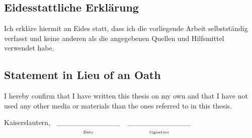 \documentclass[a4paper]{report}
\begin{document}
\tableofcontents
\thispagestyle{empty}
\listoffigures
\thispagestyle{empty}
\begingroup
\thispagestyle{empty}
\let\clearpage\relax
\vspace{3cm}
\listofalgorithms
\let\clearpage\relax
\vspace{3cm}
\listoftables
\endgroup
\thispagestyle{empty}
















\pagestyle{empty}

\cleardoublepage

\null

\subsection*{Eidesstattliche Erklärung}

Ich erkläre hiermit an Eides statt, dass ich die vorliegende Arbeit
selbstständig verfasst und keine anderen als die angegebenen Quellen
und Hilfsmittel verwendet habe. 

\subsection*{Statement in Lieu of an Oath }

I hereby confirm that I have written this thesis on my own and that
I have not used any other media or materials than the ones referred
to in this thesis. 

\vspace{2cm}


Kaiserslautern, $\begin{array}[t]{c}
    \text{\_\_\_\_\_\_\_\_\_\_\_\_}\\
    {\scriptscriptstyle \text{Date}}
\end{array}$\hfill{$\begin{array}[t]{c}
    \_\_\_\_\_\_\_\_\_\_\_\_\\
    {\scriptscriptstyle \text{Signature}}
\end{array}$\hfill}
\end{document}

